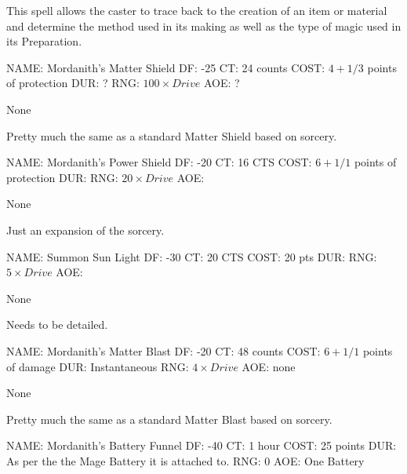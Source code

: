 \bigskip


This spell allows the caster to trace back to the creation
of an item or material and determine the method used in its making
as well as the type of magic used in its Preparation.

\newpage

\spell
NAME: Mordanith's Matter Shield
DF:  -25
CT:  24 counts
COST:  \( 4 + 1/3 \) points of protection
DUR: ?
RNG:  \( 100 \times Drive \)
AOE: ?

\bigskip
{}

None

\bigskip
{}

Pretty much the same as a standard Matter Shield based on sorcery.

\newpage

\spell
NAME: Mordanith's Power Shield
DF:  -20
CT:  16 CTS
COST:  \( 6 + 1/1 \) points of protection
DUR:
RNG:  \( 20 \times Drive \)
AOE:

\bigskip
{}

None

\bigskip
{}

Just an expansion of the sorcery.

\newpage

\spell
NAME: Summon Sun Light
DF:  -30
CT:  20 CTS
COST:  20 pts
DUR:
RNG:  \( 5 \times Drive \)
AOE:

\bigskip
{}

None

\bigskip
{}

Needs to be detailed.

\newpage

\spell
NAME: Mordanith's Matter Blast
DF:  -20
CT:  48 counts
COST:  \(  6 + 1/1 \) points of damage
DUR:  Instantaneous
RNG:  \( 4 \times Drive \)
AOE:  none

\bigskip


None

\bigskip
{}

Pretty much the same as a standard Matter Blast based on sorcery.

\newpage

\spell
NAME: Mordanith's Battery Funnel
DF:  -40
CT:  1 hour
COST: 25 points
DUR:  As per the the Mage Battery it is attached to.
RNG:  0
AOE:  One Battery

